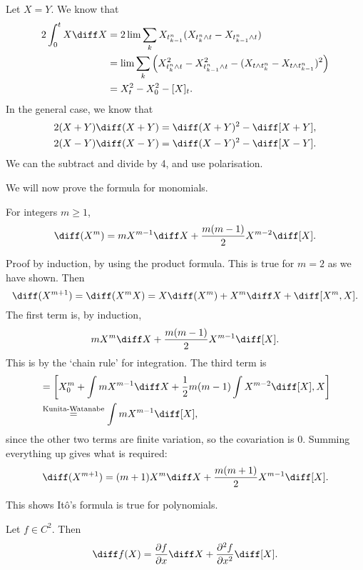 \documentclass[12pt]{article}
\begin{document}
\begin{proofbox}
	Let $X = Y$. We know that
	\begin{align*}
		2\int_0^{t} X \diff X &= 2\lim \sum_{k} X_{t_{k-1}^{n}} (X_{t_k^{n} \wedge t} - X_{t_{k-1}^{n} \wedge t}) \\
				     &= \lim \sum_k \left( X_{t_k^{n} \wedge t}^2 - X_{t_{k-1}^{n} \wedge t}^2 - (X_{t \wedge t_k^{n}} - X_{t \wedge t_{k-1}^{n}})^2 \right) \\
				     &= X_t^2 - X_0^2 - [X]_t.
	\end{align*}
	In the general case, we know that
	\begin{align*}
		2 (X + Y) \diff (X + Y) &= \diff (X + Y)^2 - \diff[X + Y], \\
		2 (X - Y) \diff (X - Y) &= \diff (X - Y)^2 - \diff [X - Y].
	\end{align*}
	We can the subtract and divide by 4, and use polarisation.
\end{proofbox}

We will now prove the formula for monomials.

\begin{proposition}
	For integers $m \geq 1$,
	\[
		\diff (X^{m}) = m X^{m-1} \diff X + \frac{m(m-1)}{2} X^{m-2} \diff [X].
	\]
\end{proposition}

\begin{proofbox}
	Proof by induction, by using the product formula. This is true for $m = 2$ as we have shown. Then
	\[
		\diff (X^{m+1}) = \diff (X^{m} X) = X \diff (X^{m}) + X^{m} \diff X + \diff [X^{m}, X].
	\]
	The first term is, by induction,
	\[
		m X^{m} \diff X + \frac{m(m-1)}{2} X^{m-1} \diff [X].
	\]
	This is by the `chain rule' for integration. The third term is
	\begin{align*}
		[X^{m}, X] &= \left[ X_0^{m} + \int m X^{m-1} \diff X + \frac 12 m(m-1) \int X^{m-2} \diff [X], X \right] \\
			   &\overset{\text{Kunita-Watanabe}}= \int m X^{m-1} \diff [X],
	\end{align*}
	since the other two terms are finite variation, so the covariation is 0. Summing everything up gives what is required:
	\[
		\diff (X^{m+1}) = (m+1) X^{m} \diff X + \frac{m(m+1)}{2} X^{m-1} \diff [X].
	\]
\end{proofbox}

This shows It\^o's formula is true for polynomials.

\begin{theorem}[It\^o's formula for $n = 1$]
	Let $f \in C^2$. Then
	\[
		\diff f(X) = \frac{\partial f}{\partial x} \diff X + \frac{\partial^2 f}{\partial x^2} \diff [X].
	\]
\end{theorem}
\end{document}
